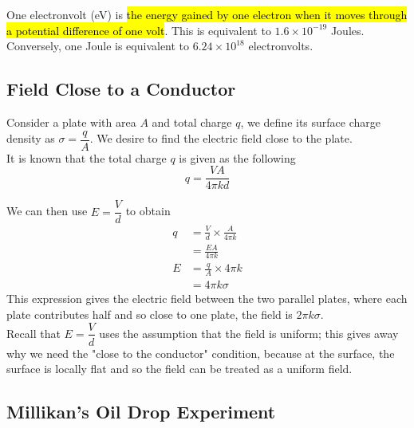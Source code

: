 \documentclass[a4paper,12pt]{article}
\newcommand{\lb}{\\[8pt]}
\begin{document}
One electronvolt (eV) is \hl{the energy gained by one electron when it moves through a potential difference of one volt}. This is equivalent to $1.6 \times 10^{-19}$ Joules.\lb
Conversely, one Joule is equivalent to $6.24 \times 10^{18}$ electronvolts.

\pagebreak

\subsection{Field Close to a Conductor}

Consider a plate with area $A$ and total charge $q$, we define its surface charge density as $\sigma = \dfrac{q}{A}$. We desire to find the electric field close to the plate.\lb
It is known that the total charge $q$ is given as the following
\begin{equation}\label{eq:charge}
  q = \frac{VA}{4\pi kd}
\end{equation}

We can then use $E = \dfrac{V}{d}$ to obtain
\begin{align*}
  q & = \frac{V}{d}\times\frac{A}{4\pi k} \\
    & = \frac{EA}{4\pi k}                 \\
  E & = \frac{q}{A} \times 4\pi k         \\
    & =  4\pi k\sigma
\end{align*}
This expression gives the electric field between the two parallel plates, where each plate contributes half and so close to one plate, the field is $2\pi k\sigma$.\lb
Recall that $E = \dfrac{V}{d}$ uses the assumption that the field is uniform; this gives away why we need the "close to the conductor" condition, because at the surface, the surface is locally flat and so the field can be treated as a uniform field.

\pagebreak

\subsection{Millikan's Oil Drop Experiment}
\end{document}
